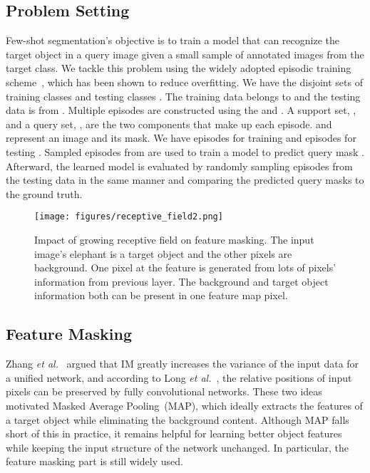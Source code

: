 \documentclass[runningheads]{llncs}
\begin{document}
\subsection{Problem Setting}
\label{subsection:problem_setting}
Few-shot segmentation's objective is to train a model that can recognize the target object in a query image given a small sample of annotated images from the target class.
We tackle this problem using the widely adopted episodic training scheme~\cite{episodic, PANet, HSNet, VAT}, which has been shown to reduce overfitting. We have the disjoint sets of training classes  and testing classes . The training data  belongs to  and the testing data  is from .
Multiple episodes are constructed using the  and . 
A support set, , and a query set, , are the two components that make up each episode.  and  represent an image and its mask. We have  episodes for training  and  episodes for testing . 
Sampled episodes from  are used to train a model to predict query mask .
Afterward, the learned model is evaluated by randomly sampling episodes from the testing data  in the same manner and comparing the predicted query masks to the ground truth.




\begin{wrapfigure}[20]{h}[0cm]{0.42\textwidth}\centering
\vspace{-30pt}    
\texttt{[image: figures/receptive\_field2.png]}
\caption{ \small Impact of growing receptive field on feature masking. The input image's elephant is a target object and the other pixels are background. One pixel at the feature is generated from lots of pixels' information from previous layer. The background and target object information both can be present in one feature map pixel.}    
\label{fig:receptive_field}
\end{wrapfigure}        


\subsection{Feature Masking}
\label{subsection:feature_masking}
Zhang \textit{et al.}~\cite{Zhang2020SGOneSG} argued that IM greatly increases the variance of the input data for a unified network, and according to Long \textit{et al.}~\cite{FCN}, the relative positions of input pixels can be preserved by fully convolutional networks.
These two ideas motivated Masked Average Pooling~(MAP), which ideally extracts the features of a target object while eliminating the background content.
Although MAP falls short of this in practice, it remains helpful for learning better object features~\cite{Deeplab} while keeping the input structure of the network unchanged.  In particular, the feature masking part is still widely used.
\end{document}
